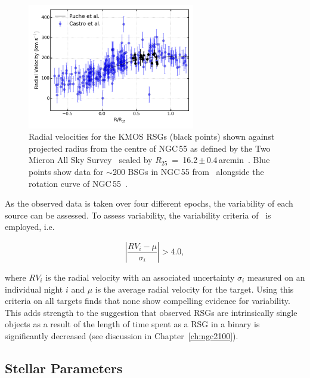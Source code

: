 \begin{figure}
 \centering
 \includegraphics[width=0.65\textwidth]{ngc55/NGC55-RvsRV}
 \caption[Radial velocities for KMOS targets shown against projected radius]{
 Radial velocities for the KMOS RSGs (black points) shown against projected radius from the centre of NGC\,55 as defined by the Two Micron All Sky Survey~\citep[2MASS;][]{2006AJ....131.1163S} scaled by $R_{25}$~=~16.2\,$\pm$\,0.4\,arcmin~\citep{1991rc3..book.....D}.
Blue points show data for $\sim$200 BSGs in NGC\,55 from~\citet[][shown with 50\% transparency to highlight densely populated areas]{2008A&A...485...41C} alongside the rotation curve of NGC\,55~\citep[black solid line;][]{1991AJ....101..447P}.}
 \label{fig:RvsRV}
\end{figure}

As the observed data is taken over four different epochs, the variability of each source can be assessed.
To assess variability, the variability criteria of~\citet{2012A&A...546A..73H} is employed, i.e.

\begin{equation}
  \left|\frac{RV_i - \mu}{\sigma_i}\right| > 4.0,\label{eq:vary}
\end{equation}

\noindent where $RV_i$ is the radial velocity with an associated uncertainty  $\sigma_i$ measured on an individual night $i$ and $\mu$ is the average radial velocity for the target.
Using this criteria on all targets finds that none show compelling evidence for variability.
This adds strength to the suggestion that observed RSGs are intrinsically single objects as a result of the length of time spent as a RSG in a binary is significantly decreased (see discussion in Chapter~\ref{ch:ngc2100}).


\subsection{Stellar Parameters} %
\label{sub:stellar_parameters}

